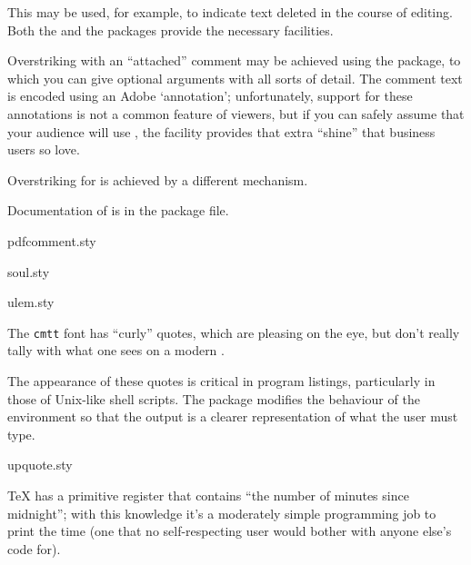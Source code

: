 
This may be used, for example, to indicate text deleted in the course
of editing.  Both the  and the  packages
provide the necessary facilities.

Overstriking with an ``attached'' comment may be achieved using the
 package, to which you can give optional arguments
with all sorts of detail.  The comment text is encoded using an Adobe
`annotation'; unfortunately, support for these annotations is not a
common feature of  viewers, but if you can safely assume
that your audience will use , the facility
provides that extra ``shine'' that business users so love.

Overstriking for %
 is achieved
by a different mechanism.

Documentation of  is in the package file.
\begin{ctanrefs}
\item[pdfcomment.sty]
\item[soul.sty]
\item[ulem.sty]
\end{ctanrefs}


The \texttt{cmtt} font has ``curly'' quotes,
which are pleasing on the eye, but don't really tally with what one
sees on a modern %
.

The appearance of these quotes is critical in program listings,
particularly in those of Unix-like shell scripts.  The
 package modifies the behaviour of the
 environment so that the output is a clearer
representation of what the user must type.
\begin{ctanrefs}
\item[upquote.sty]
\end{ctanrefs}


\TeX{} has a primitive register that contains ``the number of minutes
since midnight''; with this knowledge it's a moderately simple
programming job to print the time (one that no self-respecting
\plaintex{} user would bother with anyone else's code for).

